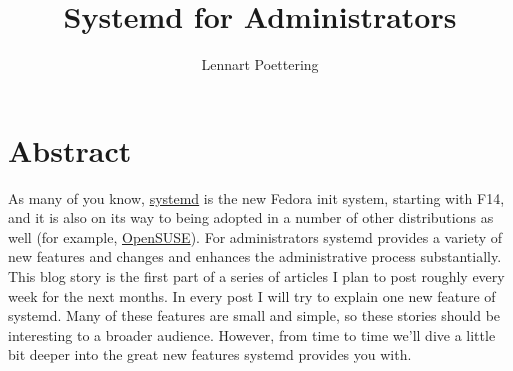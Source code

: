 \documentclass[titlepage]{article}
\title{Systemd for Administrators}
\author{Lennart Poettering}
\begin{document}
\maketitle
\tableofcontents
\newpage

\section{Abstract}
As many of you know,
\href{https://www.freedesktop.org/wiki/Software/systemd}{systemd} is the new
Fedora init system, starting with F14, and it is also on its way to being
adopted in a number of other distributions as well (for example,
\href{https://en.opensuse.org/SDB:Systemd}{OpenSUSE}). For administrators
systemd provides a variety of new features and changes and enhances the
administrative process substantially. This blog story is the first part of a
series of articles I plan to post roughly every week for the next months. In
every post I will try to explain one new feature of systemd. Many of these
features are small and simple, so these stories should be interesting to a
broader audience. However, from time to time we'll dive a little bit deeper
into the great new features systemd provides you with.  
\newpage
\end{document}
